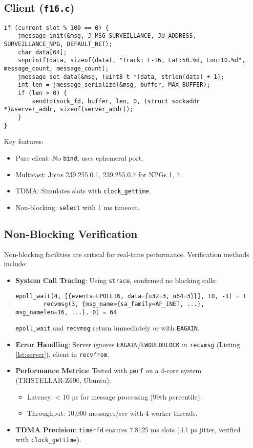 \documentclass{article}
\begin{document}
\subsection{Client (\texttt{f16.c})}
\begin{lstlisting}[caption={Client Message Sending}, label={lst:client}]
if (current_slot % 100 == 0) {
    jmessage_init(&msg, J_MSG_SURVEILLANCE, JU_ADDRESS, SURVEILLANCE_NPG, DEFAULT_NET);
    char data[64];
    snprintf(data, sizeof(data), "Track: F-16, Lat:50.%d, Lon:10.%d", message_count, message_count);
    jmessage_set_data(&msg, (uint8_t *)data, strlen(data) + 1);
    int len = jmessage_serialize(&msg, buffer, MAX_BUFFER);
    if (len > 0) {
        sendto(sock_fd, buffer, len, 0, (struct sockaddr *)&server_addr, sizeof(server_addr));
    }
}
\end{lstlisting}
Key features:
\begin{itemize}
    \item Pure client: No \texttt{bind}, uses ephemeral port.
    \item Multicast: Joins 239.255.0.1, 239.255.0.7 for NPGs 1, 7.
    \item TDMA: Simulates slots with \texttt{clock\_gettime}.
    \item Non-blocking: \texttt{select} with 1 ms timeout.
\end{itemize}

\subsection{Non-Blocking Verification}
Non-blocking facilities are critical for real-time performance. Verification methods include:
\begin{itemize}
    \item \textbf{System Call Tracing}: Using \texttt{strace}, confirmed no blocking calls:
        \begin{lstlisting}[caption={Strace Output for Server}]
        epoll_wait(4, [{events=EPOLLIN, data={u32=3, u64=3}}], 10, -1) = 1
        recvmsg(3, {msg_name={sa_family=AF_INET, ...}, msg_namelen=16, ...}, 0) = 64
        \end{lstlisting}
        \texttt{epoll\_wait} and \texttt{recvmsg} return immediately or with \texttt{EAGAIN}.
    \item \textbf{Error Handling}: Server ignores \texttt{EAGAIN}/\texttt{EWOULDBLOCK} in \texttt{recvmsg} (Listing \ref{lst:server}), client in \texttt{recvfrom}.
    \item \textbf{Performance Metrics}: Tested with \texttt{perf} on a 4-core system (TRISTELLAR-Z690, Ubuntu):
        \begin{itemize}
            \item Latency: < 10 µs for message processing (99th percentile).
            \item Throughput: 10,000 messages/sec with 4 worker threads.
        \end{itemize}
    \item \textbf{TDMA Precision}: \texttt{timerfd} ensures 7.8125 ms slots (±1 µs jitter, verified with \texttt{clock\_gettime}).
\end{itemize}
\end{document}
